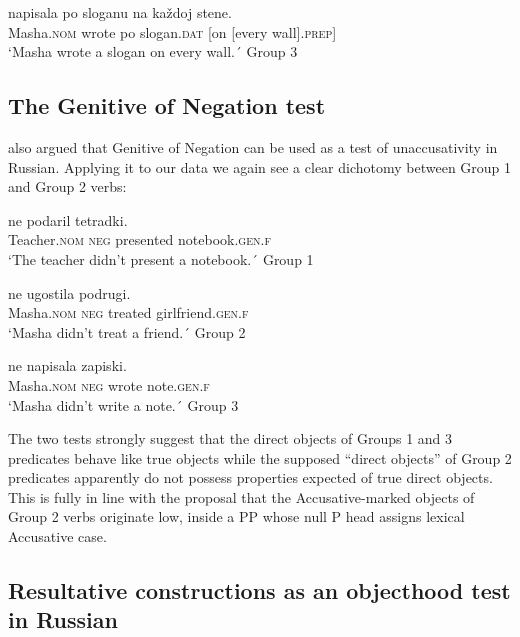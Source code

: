 \documentclass[output=paper,colorlinks,citecolor=brown,nonflat]{./langscibook}
\begin{document}
\ea%
    \label{ex:antonyuk:24}
                 {napisala} {po} {sloganu}        {na}  {každoj} {stene}.\\
    Masha.\textsc{nom}   wrote     po slogan.\textsc{dat} [on [every  wall].\textsc{prep}]\\
    \glt `Masha wrote a slogan on every wall.´ \hfill{Group 3}
    \z

\subsection{The Genitive of Negation test}\label{sec:antonyuk:3.2}

\citet{Pesetsky1982} also argued that Genitive of Negation can be used as a test of unaccusativity in Russian. Applying it to our data we again see a clear dichotomy between Group 1 and Group 2 verbs:

\ea%
    \label{ex:antonyuk:25}
               {ne}      {podaril}     {tetradki}.\\
    Teacher.\textsc{nom} \textsc{neg} presented notebook.\textsc{gen.f}\\
    \glt `The teacher didn’t present a notebook.´ \hfill{Group 1}
    \z

\ea%
    \label{ex:antonyuk:26}
               {ne}        {ugostila} {podrugi}.\\
    Masha.\textsc{nom}   \textsc{neg}  treated  girlfriend.\textsc{gen.f}\\
    \glt `Masha didn’t treat a friend.´ \hfill{Group 2}
    \z

\ea%
    \label{ex:antonyuk:27}
                {ne}     {napisala} {zapiski}.\\
    Masha.\textsc{nom}  \textsc{neg} wrote      note.\textsc{gen.f}\\
    \glt `Masha didn’t write a note.´ \hfill{Group 3}
    \z

The two tests strongly suggest that the direct objects of Groups 1 and 3 predicates behave like true objects while the supposed “direct objects” of Group 2 predicates apparently do not possess properties expected of true direct objects. This is fully in line with the proposal that the Accusative-marked objects of Group 2 verbs originate low, inside a PP whose null P head assigns lexical Accusative case. 

\subsection{Resultative constructions as an objecthood test in Russian}\label{sec:antonyuk:3.3}
\end{document}
